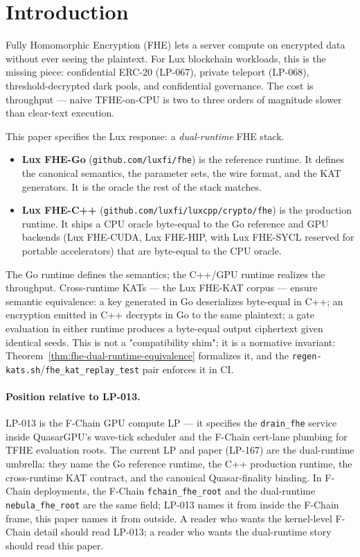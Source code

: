 \section{Introduction}
\label{sec:fhe-runtime-intro}

Fully Homomorphic Encryption (FHE) lets a server compute on encrypted
data without ever seeing the plaintext. For Lux blockchain workloads,
this is the missing piece: confidential ERC-20 (LP-067), private
teleport (LP-068), threshold-decrypted dark pools, and confidential
governance. The cost is throughput --- naive TFHE-on-CPU is two to
three orders of magnitude slower than clear-text execution.

This paper specifies the Lux response: a \emph{dual-runtime} FHE stack.

\begin{itemize}
\item \textbf{Lux FHE-Go} (\texttt{github.com/luxfi/fhe}) is the
reference runtime. It defines the canonical semantics, the
parameter sets, the wire format, and the KAT generators. It is the
oracle the rest of the stack matches.
\item \textbf{Lux FHE-C++} (\texttt{github.com/luxfi/luxcpp/crypto/fhe})
is the production runtime. It ships a CPU oracle byte-equal to the
Go reference and GPU backends (Lux FHE-CUDA, Lux FHE-HIP, with
Lux FHE-SYCL reserved for portable accelerators) that are byte-equal
to the CPU oracle.
\end{itemize}

The Go runtime defines the semantics; the C++/GPU runtime realizes the
throughput. Cross-runtime KATs --- the Lux FHE-KAT corpus --- ensure
semantic equivalence: a key generated in Go deserializes byte-equal in
C++; an encryption emitted in C++ decrypts in Go to the same plaintext;
a gate evaluation in either runtime produces a byte-equal output
ciphertext given identical seeds. This is not a "compatibility shim";
it is a normative invariant: Theorem~\ref{thm:fhe-dual-runtime-equivalence}
formalizes it, and the
\texttt{regen-kats.sh}/\texttt{fhe\_kat\_replay\_test} pair enforces it
in CI.

\paragraph{Position relative to LP-013.}
LP-013 is the F-Chain GPU compute LP --- it specifies the
\texttt{drain\_fhe} service inside QuasarGPU's wave-tick scheduler and
the F-Chain cert-lane plumbing for TFHE evaluation roots. The current
LP and paper (LP-167) are the dual-runtime umbrella: they name the Go
reference runtime, the C++ production runtime, the cross-runtime KAT
contract, and the canonical Quasar-finality binding. In F-Chain
deployments, the F-Chain \texttt{fchain\_fhe\_root} and the dual-runtime
\texttt{nebula\_fhe\_root} are the same field; LP-013 names it from
inside the F-Chain frame, this paper names it from outside. A reader
who wants the kernel-level F-Chain detail should read LP-013; a reader
who wants the dual-runtime story should read this paper.

